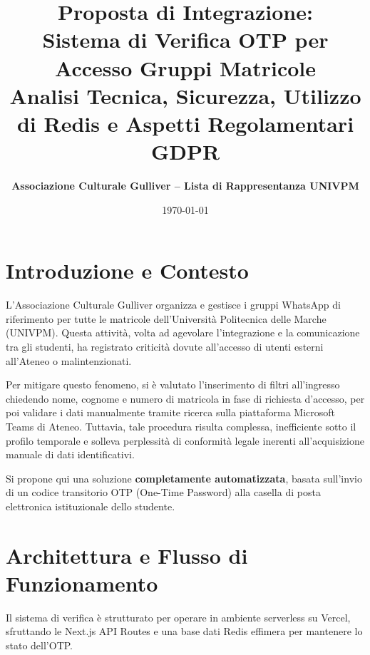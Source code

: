 \documentclass[11pt,a4paper,oneside]{article}
\title{
    \vspace{1cm}
    \textbf{\huge Proposta di Integrazione:\\ Sistema di Verifica OTP per Accesso Gruppi Matricole}\\
    \vspace{0.5cm}
    \large Analisi Tecnica, Sicurezza, Utilizzo di Redis e Aspetti Regolamentari GDPR\\
    \vspace{1cm}
}
\author{\textbf{Associazione Culturale Gulliver -- Lista di Rappresentanza UNIVPM}}
\date{\today}
\begin{document}
\maketitle

\section{Introduzione e Contesto}
L'Associazione Culturale Gulliver organizza e gestisce i gruppi WhatsApp di riferimento per tutte le matricole dell'Università Politecnica delle Marche (UNIVPM). Questa attività, volta ad agevolare l'integrazione e la comunicazione tra gli studenti, ha registrato criticità dovute all'accesso di utenti esterni all'Ateneo o malintenzionati. 

Per mitigare questo fenomeno, si è valutato l'inserimento di filtri all'ingresso chiedendo nome, cognome e numero di matricola in fase di richiesta d'accesso, per poi validare i dati manualmente tramite ricerca sulla piattaforma Microsoft Teams di Ateneo. Tuttavia, tale procedura risulta complessa, inefficiente sotto il profilo temporale e solleva perplessità di conformità legale inerenti all'acquisizione manuale di dati identificativi. 

Si propone qui una soluzione \textbf{completamente automatizzata}, basata sull'invio di un codice transitorio OTP (One-Time Password) alla casella di posta elettronica istituzionale dello studente.

\section{Architettura e Flusso di Funzionamento}
Il sistema di verifica è strutturato per operare in ambiente serverless su Vercel, sfruttando le Next.js API Routes e una base dati Redis effimera per mantenere lo stato dell'OTP.
\end{document}
